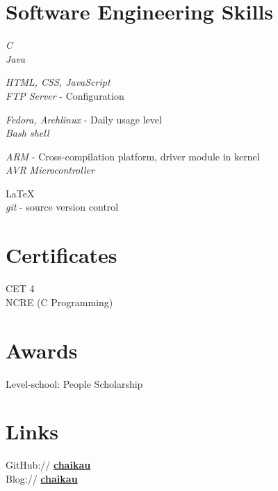 \documentclass[10pt]{article} %
\begin{document}
\section{Software Engineering Skills}

{
\textit{C}\\
\textit{Java}
}


{
\textit{HTML, CSS, JavaScript}\\
\textit{FTP Server} - Configuration
}


{
\textit{Fedora, Archlinux} - Daily usage level\\
\textit{Bash shell}
}

{
\textit{ARM} - Cross-compilation platform, driver module in kernel\\
\textit{AVR Microcontroller}
}

{
\LaTeX\\
\textit{git} - source version control
}

\section{Certificates}
CET 4 \\
NCRE (C Programming) 

\section{Awards}
Level-school: People Scholarship


\section{Links}
GitHub:// \href{https://github.com/chaikau}{\bf chaikau}\\
Blog:// \href{http://my.oschina.net/chaiko/blog}{\bf chaikau}

\end{document}
